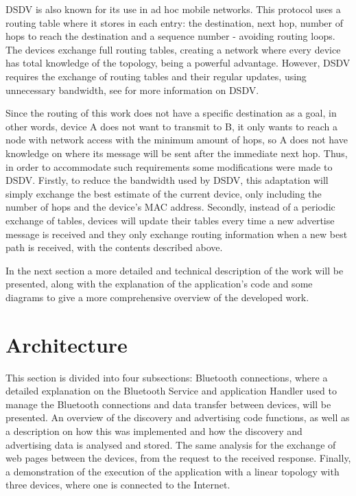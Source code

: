 \gls{DSDV} is also known for its use in ad hoc mobile networks. This protocol uses a routing table where it stores in each entry: the destination, next hop, number of hops to reach the destination and a sequence number - avoiding routing loops. The devices exchange full routing tables, creating a network where every device has total knowledge of the topology, being a powerful advantage. However, \gls{DSDV} requires the exchange of routing tables and their regular updates, using unnecessary bandwidth, see \cite{dsdv} for more information on \gls{DSDV}.

Since the routing of this work does not have a specific destination as a goal, in other words, device A does not want to transmit to B, it only wants to reach a node with network access with the minimum amount of hops, so A does not have knowledge on where its message will be sent after the immediate next hop. Thus, in order to accommodate such requirements some modifications were made to \gls{DSDV}. Firstly, to reduce the bandwidth used by \gls{DSDV}, this adaptation will simply exchange the best estimate of the current device, only including the number of hops and the device's \gls{MAC} address. Secondly, instead of a periodic exchange of tables, devices will update their tables every time a new advertise message is received and they only exchange routing information when a new best path is received, with the contents described above.

In the next section a more detailed and technical description of the work will be presented, along with the explanation of the application's code and some diagrams to give a more comprehensive overview of the developed work.

\section{Architecture}
\label{sec:architecture}

This section is divided into four subsections: Bluetooth connections, where a detailed explanation on the Bluetooth Service and application Handler used to manage the Bluetooth connections and data transfer between devices, will be presented. An overview of the discovery and advertising code functions, as well as a description on how this was implemented and how the discovery and advertising data is analysed and stored. The same analysis for the exchange of web pages between the devices, from the request to the received response. Finally, a demonstration of the execution of the application with a linear topology with three devices, where one is connected to the Internet.

